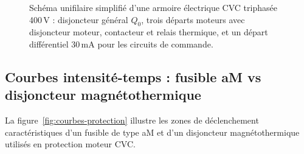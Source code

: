 \begin{figure}[htbp]
  \caption{Schéma unifilaire simplifié d'une armoire électrique CVC triphasée 400\,V : disjoncteur général $Q_0$, trois départs moteurs avec disjoncteur moteur, contacteur et relais thermique, et un départ différentiel 30\,mA pour les circuits de commande.}
  \label{fig:armoire-cvc}
\end{figure}

\subsection{Courbes intensité-temps : fusible aM vs disjoncteur magnétothermique}

La figure~\ref{fig:courbes-protection} illustre les zones de déclenchement caractéristiques d'un fusible de type aM et d'un disjoncteur magnétothermique utilisés en protection moteur CVC.

